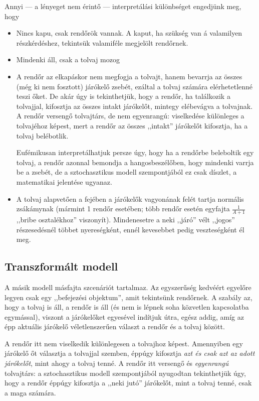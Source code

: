 \documentclass{article}
\begin{document}
	Annyi --- a lényeget nem érintő --- interpretálási különbséget engedjünk meg, hogy
	\begin{itemize}
		\item Nincs kapu, csak rendőrök vannak. A kaput, ha szükség van á valamilyen részkérdéshez, tekintsük valamiféle megjelölt rendőrnek.
		\item Mindenki áll, csak a tolvaj mozog
		\item A rendőr az elkapáskor nem megfogja a tolvajt, hanem bevarrja az összes (még ki nem fosztott) járókelő zsebét, ezáltal a tolvaj számára elérhetetlenné teszi őket.
		De akár úgy is tekinthetjük, hogy a rendőr, ha találkozik a tolvajjal, kifosztja az összes intakt járókelőt, mintegy elébevágva a tolvajnak.
		A rendőr versengő tolvajtárs, de nem egyenrangú: viselkedése különleges a tolvajéhoz képest, mert a rendőr az összes ,,intakt'' járókelőt kifosztja, ha a tolvaj belébotlik.

		Eufémikusan interpretálhatjuk persze úgy, hogy ha a rendőrbe beleboltik egy tolvaj, a rendőr azonnal bemondja a hangosbeszélőben, hogy mindenki varrja be a zsebét, de a sztochasztikus modell szempontjából ez csak díszlet, a matematikai jelentése ugyanaz.
		\item A tolvaj alapvetően a fejében a járókelők vagyonának felét tartja normális zsákámynak (mármint 1 rendőr esetében; több rendőr esetén egyfajta $\frac1{A+1}$ ,,bribe osztalékhoz'' viszonyít). Mindenesetre a neki ,,járó'' vélt ,,jogos'' részesedésnél többet nyereségként, ennél kevesebbet pedig veszteségként él meg.
	\end{itemize}

	\subsection{Transzformált modell}

	A másik modell másfajta szcenáriót tartalmaz. Az egyszerűség kedvéért egyelőre legyen csak egy ,,befejezési objektum'', amit tekintsünk rendőrnek.
	A szabály az, hogy a tolvaj is áll, a rendőr is áll (és nem is lépnek soha közvetlen kapcsolatba egymással), viszont a járókelőket egyesével indítjuk útra, egész addig, amíg az épp aktuális járókelő véletlenszerűen választ a rendőr és a tolvaj között.

	A rendőr itt nem viselkedik különlegesen a tolvajhoz képest. Amennyiben egy járókelő őt választja a tolvajjal szemben, éppúgy kifosztja \emph{azt és csak azt az adott járókelőt}, mint ahogy a tolvaj tenné. A rendőr itt versengő és \emph{egyenrangú} tolvajtárs: a sztochasztikus modell szempontjából nyugodtan tekinthetjük úgy, hogy a rendőr éppúgy kifosztja a ,,neki jutó'' járókelőt, mint a tolvaj tenné, csak a maga számára.
\end{document}
